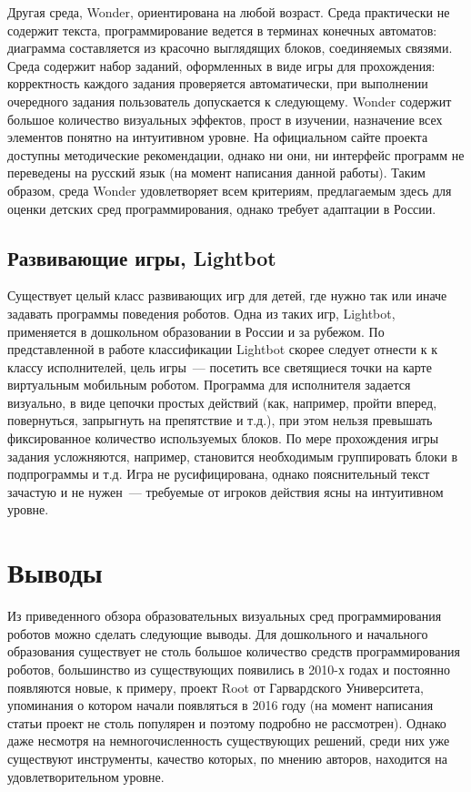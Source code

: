 \documentclass[a5paper]{article}
\begin{document}
Другая среда, Wonder, ориентирована на любой возраст. Среда практически не содержит текста, программирование 
ведется в терминах конечных автоматов: диаграмма составляется из красочно выглядящих блоков, соединяемых связями. 
Среда содержит набор заданий, оформленных в виде игры для прохождения: корректность каждого задания проверяется 
автоматически, при выполнении очередного задания пользователь допускается к следующему. Wonder содержит большое 
количество визуальных эффектов, прост в изучении, назначение всех элементов понятно на интуитивном уровне. На 
официальном сайте проекта доступны методические рекомендации, однако ни они, ни интерфейс программ не переведены 
на русский язык (на момент написания данной работы). Таким образом, среда Wonder удовлетворяет всем критериям, 
предлагаемым здесь для оценки детских сред программирования, однако требует адаптации в России.

\subsection{Развивающие игры, Lightbot}

Существует целый класс развивающих игр для детей, где нужно так или иначе задавать программы поведения роботов. 
Одна из таких игр, Lightbot, применяется в дошкольном образовании в России и за рубежом. По представленной в 
работе классификации Lightbot скорее следует отнести к к классу исполнителей, цель игры~--- посетить все 
светящиеся точки на карте виртуальным мобильным роботом. Программа для исполнителя задается визуально, в виде 
цепочки простых действий (как, например, пройти вперед, повернуться, запрыгнуть на препятствие и т.д.), при 
этом нельзя превышать фиксированное количество используемых блоков. По мере прохождения игры задания усложняются, 
например, становится необходимым группировать блоки в подпрограммы и т.д. Игра не русифицирована, однако 
пояснительный текст зачастую и не нужен~--- требуемые от игроков действия ясны на интуитивном уровне.

\section{Выводы}

Из приведенного обзора образовательных визуальных сред программирования роботов можно сделать следующие выводы. 
Для дошкольного и начального образования существует не столь большое количество средств программирования роботов, 
большинство из существующих появились в 2010-х годах и постоянно появляются новые, к примеру, проект Root от 
Гарвардского Университета, упоминания о котором начали появляться в 2016 году (на момент написания статьи проект 
не столь популярен и поэтому подробно не рассмотрен). Однако даже несмотря на немногочисленность существующих 
решений, среди них уже существуют инструменты, качество которых, по мнению авторов, находится на удовлетворительном 
уровне. 
\end{document}
